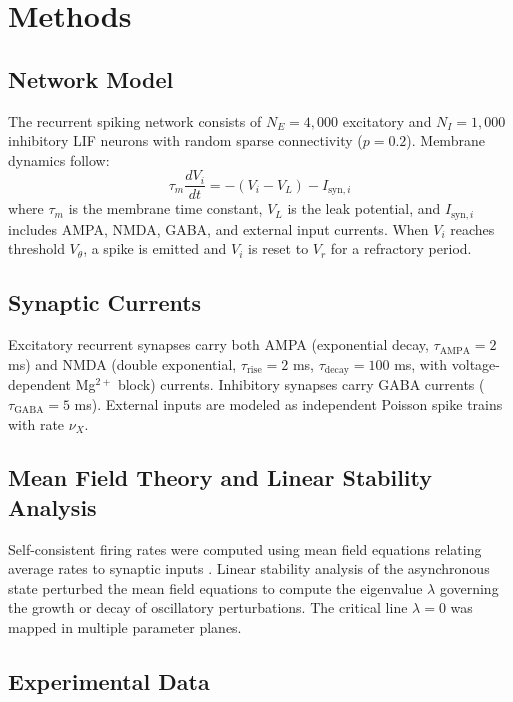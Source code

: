 \documentclass[11pt]{article}
\begin{document}
\section{Methods}

\subsection{Network Model}

The recurrent spiking network consists of $N_E = 4{,}000$ excitatory and $N_I = 1{,}000$ inhibitory LIF neurons with random sparse connectivity ($p = 0.2$). Membrane dynamics follow:
\begin{equation}
\tau_m \frac{dV_i}{dt} = -(V_i - V_L) - I_{\mathrm{syn},i}
\end{equation}
where $\tau_m$ is the membrane time constant, $V_L$ is the leak potential, and $I_{\mathrm{syn},i}$ includes AMPA, NMDA, GABA, and external input currents. When $V_i$ reaches threshold $V_\theta$, a spike is emitted and $V_i$ is reset to $V_r$ for a refractory period.

\subsection{Synaptic Currents}

Excitatory recurrent synapses carry both AMPA (exponential decay, $\tau_{\mathrm{AMPA}} = 2$ ms) and NMDA (double exponential, $\tau_{\mathrm{rise}} = 2$ ms, $\tau_{\mathrm{decay}} = 100$ ms, with voltage-dependent Mg$^{2+}$ block) currents. Inhibitory synapses carry GABA currents ($\tau_{\mathrm{GABA}} = 5$ ms). External inputs are modeled as independent Poisson spike trains with rate $\nu_X$.

\subsection{Mean Field Theory and Linear Stability Analysis}

Self-consistent firing rates were computed using mean field equations relating average rates to synaptic inputs \citep{brunel2000dynamics, brunel2003fast}. Linear stability analysis of the asynchronous state perturbed the mean field equations to compute the eigenvalue $\lambda$ governing the growth or decay of oscillatory perturbations. The critical line $\lambda = 0$ was mapped in multiple parameter planes.

\subsection{Experimental Data}
\end{document}
